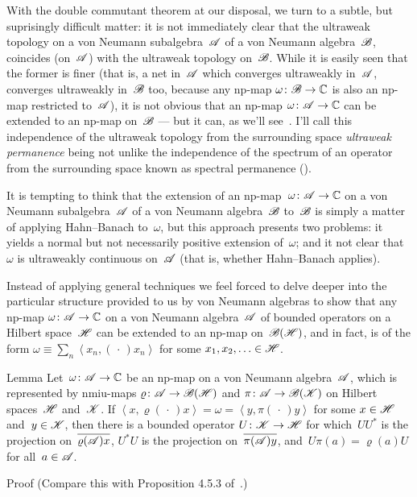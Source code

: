 \documentclass[a]{subfiles}
\begin{document}
\begin{parsec}%
\begin{point}%
With the double commutant theorem at our disposal,
we turn to a subtle, but suprisingly difficult matter:
it is not immediately clear
that the ultraweak topology on a von Neumann
subalgebra~$\mathscr{A}$ of a von Neumann algebra~$\mathscr{B}$,
coincides (on~$\mathscr{A}$) with the ultraweak topology on~$\mathscr{B}$.
While it is easily seen that the former is finer
(that is, a net in~$\mathscr{A}$ which converges ultraweakly in~$\mathscr{A}$,
converges ultraweakly in~$\mathscr{B}$ too, because any np-map 
$\omega\colon \mathscr{B}\to\mathbb{C}$ is also an np-map restricted to~$\mathscr{A}$),
it is not obvious that an np-map $\omega\colon \mathscr{A}\to\mathbb{C}$
can be extended to an np-map on~$\mathscr{B}$
--- but it can, as we'll see~.
I'll call this independence of the ultraweak topology
from the surrounding space
\emph{ultraweak permanence}
being not unlike the independence
of the spectrum of an operator from the surrounding space
known as spectral permanence ().


It is tempting to think that the extension of an np-map~$\omega\colon \mathscr{A}
\to\mathbb{C}$
on a von Neumann
subalgebra~$\mathscr{A}$ of a von Neumann algebra~$\mathscr{B}$
to~$\mathscr{B}$ is simply a matter of applying Hahn--Banach to~$\omega$,
but this approach presents two problems:
it yields a normal but not necessarily positive extension
of~$\omega$;
and it not clear that~$\omega$ is ultraweakly continuous
on~$\mathscr{A}$ (that is, whether Hahn--Banach applies).

Instead of applying general techniques we feel forced
to delve deeper
into the particular structure 
provided to us by von Neumann algebras
to show that any np-map
$\omega\colon \mathscr{A}\to\mathbb{C}$
on a von Neumann algebra~$\mathscr{A}$
of bounded operators on a Hilbert space~$\mathscr{H}$
can be extended to an np-map on~$\mathscr{B}(\mathscr{H})$,
and in fact, is of the form
$\omega\equiv \sum_n \left<x_n,(\,\cdot\,)x_n\right>$
for some $x_1,x_2,\dotsc \in\mathscr{H}$.
\end{point}
\begin{point}{Lemma}%
Let~$\omega\colon \mathscr{A}\to\mathbb{C}$
be an np-map on a von Neumann algebra~$\mathscr{A}$,
which is represented by nmiu-maps
$\varrho\colon \mathscr{A}\to\mathscr{B}(\mathscr{H})$
and $\pi\colon \mathscr{A}\to\mathscr{B}(\mathscr{K})$
on Hilbert spaces~$\mathscr{H}$ and~$\mathscr{K}$.
If $\left<x,\varrho(\,\cdot\,)x\right>
=\omega=\left<y,\pi(\,\cdot\,)y\right>$
for some  $x\in\mathscr{H}$ and~$y\in\mathscr{K}$,
then there is a bounded operator $U\colon \mathscr{K}\to\mathscr{H}$
for which~$UU^*$ is the projection
on~$\overline{\varrho(\mathscr{A})x}$,
$U^*U$ is the projection
on~$\overline{\pi(\mathscr{A})y}$,
and~$U\pi(a)=\varrho(a)U$
for all~$a\in\mathscr{A}$.
\begin{point}{Proof}%
(Compare this with Proposition 4.5.3 of~\cite{kr}.)


\end{point}
\end{point}
\end{parsec}
\end{document}
